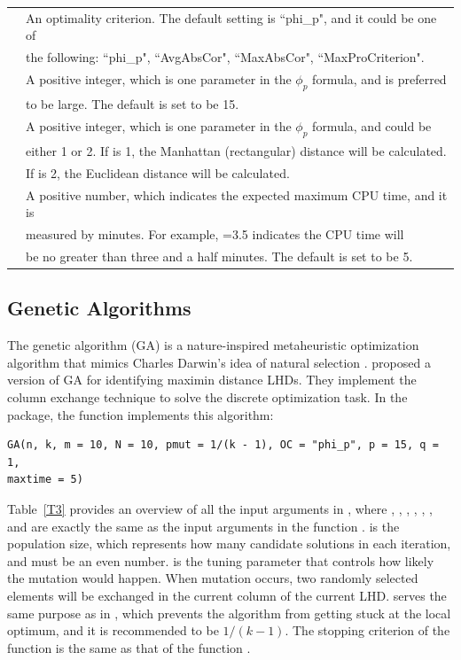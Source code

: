 \begin{table}[!htb]
\begin{center}
\begin{tabular}{ll}
				\hline
				\RR{OC} & An optimality criterion. The default setting is ``phi\_p", and it could be one of \\
				& the following: ``phi\_p", ``AvgAbsCor", ``MaxAbsCor", ``MaxProCriterion".\\
				\RR{p} & A positive integer, which is one parameter in the $\phi_{p}$ formula, and \RR{p} is preferred \\
				& to be large. The default is set to be 15.\\
				\RR{q} & A positive integer, which is one parameter in the $\phi_{p}$ formula, and \RR{q} could be\\
				& either 1 or 2. If \RR{q} is 1, the Manhattan (rectangular) distance will be calculated. \\
				& If \RR{q} is 2, the Euclidean distance will be calculated.\\
				\RR{maxtime} & A positive number, which indicates the expected maximum CPU time, and it is\\
				& measured by minutes. For example, \RR{maxtime}=3.5 indicates the CPU time will \\
				& be no greater than three and a half minutes. The default is set to be 5.\\
				\hline
		\end{tabular}
	\end{center}
\end{table}

\subsection{Genetic Algorithms}

The genetic algorithm (GA) is a nature-inspired metaheuristic optimization algorithm that mimics Charles Darwin's idea of natural selection \citep{holland1992adaptation, goldberg1989genetic}. \cite{liefvendahl2006study} proposed a version of GA for identifying maximin distance LHDs. They implement the column exchange technique to solve the discrete optimization task. In the  package, the function  implements this algorithm:
{\small
	\begin{verbatim}
GA(n, k, m = 10, N = 10, pmut = 1/(k - 1), OC = "phi_p", p = 15, q = 1,
maxtime = 5)
	\end{verbatim}
}

Table~\ref{T3} provides an overview of all the input arguments in , where , , , , , , and  are exactly the same as the input arguments in the function .  is the population size, which represents how many candidate solutions in each iteration, and must be an even number.  is the tuning parameter that controls how likely the mutation would happen. When mutation occurs, two randomly selected elements will be exchanged in the current column of the current LHD.  serves the same purpose as  in , which prevents the algorithm from getting stuck at the local optimum, and it is recommended to be $1/(k-1)$. The stopping criterion of the function is the same as that of the function .

